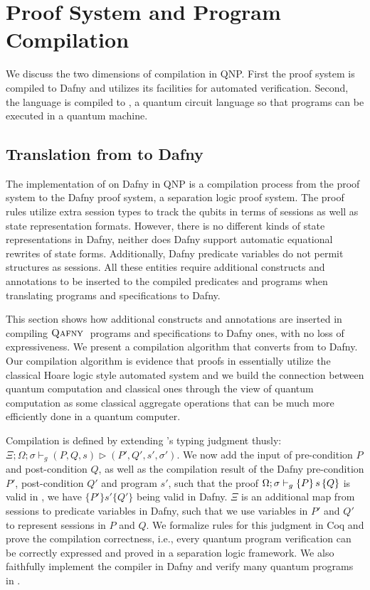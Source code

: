 \section{\qafny Proof System and Program Compilation}

We discuss the two dimensions of compilation in QNP. First the \qafny proof system is compiled to Dafny and utilizes its facilities for automated verification. Second, the \qafny language is compiled to \sqir, a quantum circuit language so that \qafny programs can be executed in a quantum machine.

\subsection{Translation from \qafny to Dafny}\label{sec:dafny-compilation}

The implementation of \qafny on Dafny in QNP is a compilation process from the \qafny proof system to the Dafny proof system, a separation logic proof system. The \qafny proof rules utilize extra session types to track the qubits in terms of sessions as well as state representation formats. However, there is no different kinds of state representations in Dafny, neither does Dafny support automatic equational rewrites of state forms. Additionally, Dafny predicate variables do not permit structures as sessions. All these entities require additional constructs and annotations to be inserted to the compiled predicates and programs when translating \qafny programs and specifications to Dafny.

This section shows how additional constructs and annotations are inserted in compiling $\textsc{Qafny}\;$ programs and specifications to Dafny ones, with no loss of expressiveness.
We present a compilation algorithm that converts from
\qafny to Dafny. Our compilation algorithm is evidence that proofs in \qafny essentially utilize the classical Hoare logic style automated system and we build the connection between quantum computation and classical ones through the view of quantum computation as some classical aggregate operations that can be much more efficiently done in a quantum computer.

Compilation is defined by extending \qafny's
typing judgment thusly: $\Xi;\Omega;\sigma\vdash_g (P,Q,s) \triangleright (P',Q',s',\sigma')$.
We now add the input of pre-condition $P$ and post-condition $Q$, as well as the compilation result of the Dafny pre-condition $P'$, post-condition $Q'$ and program $s'$, such that the proof $\Omega;\sigma\vdash_{g}\{P\}\, s \,\{Q\}$ is valid in \qafny, we have $\{P'\} s' \{Q'\}$ being valid in Dafny. $\Xi$ is an additional map from sessions to predicate variables in Dafny, such that we use variables in $P'$ and $Q'$ to represent sessions in $P$ and $Q$. We formalize rules for this judgment in Coq and prove the compilation correctness, i.e., every \qafny quantum program verification can be correctly expressed and proved in a separation logic framework. We also faithfully implement the compiler in Dafny and verify many quantum programs in .


